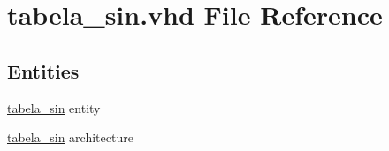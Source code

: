 \hypertarget{tabela__sin_8vhd}{}\section{tabela\+\_\+sin.\+vhd File Reference}
\label{tabela__sin_8vhd}
\subsection*{Entities}
\begin{DoxyCompactItemize}
\item 
\hyperlink{classtabela__sin}{tabela\+\_\+sin} entity
\item 
\hyperlink{classtabela__sin_1_1tabela__sin}{tabela\+\_\+sin} architecture
\end{DoxyCompactItemize}
